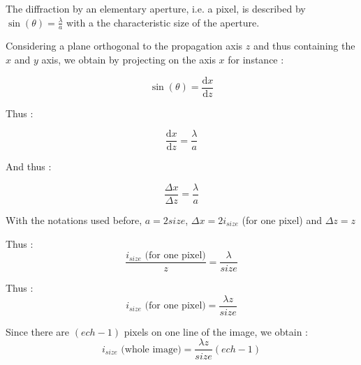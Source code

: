 \documentclass[10pt,a4paper]{article}
\begin{document}
The diffraction by an elementary aperture, i.e. a pixel, is described by
$\sin(\theta)= \frac{\lambda}{a}$  with a the characteristic size of the aperture. 

Considering a plane orthogonal to the propagation axis $z$ and thus containing the $x$ and $y$ axis, we obtain by projecting on the axis $x$ for instance :

\[\sin(\theta)=\frac{\mathrm{d}x}{\mathrm{d}z}\]

Thus :

\[\frac{\mathrm{d}x}{\mathrm{d}z}= \frac{\lambda}{a}\]

And thus :

\[\frac{\Delta x}{\Delta z}= \frac{\lambda}{a}\]

With the notations used before, $a=2size$, $\Delta x=2i_{size}$ (for one pixel) and $\Delta z = z$

Thus :
\[\frac{i_{size}\text{ (for one pixel)}}{z}=\frac{\lambda}{size}\]

Thus :
\[i_{size}\text{ (for one pixel)}=\frac{\lambda z}{size}\]

Since there are $(ech-1)$ pixels on one line of the image, we obtain :
\[i_{size}\text{ (whole image)}=\frac{\lambda z}{size}(ech-1)\]
\end{document}
